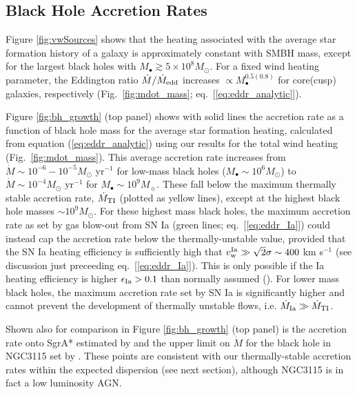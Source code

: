 \documentclass[usenatbib,fleqn]{mn2e}
\begin{document}
\subsection{Black Hole Accretion Rates}
\label{sec:mdot}

Figure \ref{fig:vwSources} shows that the heating associated with the average star formation history of a galaxy is approximately constant with SMBH mass, except for the largest black holes with $M_{\bullet} \gtrsim 5\times 10^{8}M_{\odot}$.  For a fixed wind heating parameter, the Eddington ratio $\dot{M}/\dot{M}_{\rm edd}$ increases $\propto M_{\bullet}^{0.5(0.8)}$ for core(cusp) galaxies, respectively (Fig.~\ref{fig:mdot_mass}; eq.~[\ref{eq:eddr_analytic}]).  

Figure \ref{fig:bh_growth} (top panel) shows with solid lines the accretion rate as a function of black hole mass for the average star formation heating, calculated from equation (\ref{eq:eddr_analytic}) using our results for the total wind heating (Fig.~\ref{fig:mdot_mass}).  This average accretion rate increases from $\dot{M} \sim 10^{-6}-10^{-5}M_{\odot}$ yr$^{-1}$ for low-mass black holes ($M_{\bullet} \sim 10^{6}M_{\odot}$) to $\dot{M} \sim 10^{-4}M_{\odot}$ yr$^{-1}$ for $M_{\bullet} \sim 10^{9}M_{\sun}$.  These fall below the maximum thermally stable accretion rate, $\dot{M}_{\rm TI}$ (plotted as yellow lines), except at the highest black hole masses $\sim 10^{9}M_{\odot}$.  For these highest mass black holes, the maximum accretion rate as set by gas blow-out from SN Ia (green lines; eq.~[\ref{eq:eddr_Ia}]) could instead cap the accretion rate below the thermally-unstable value, provided that the SN Ia heating efficiency is sufficiently high that $v_{\rm w}^{\rm Ia} \gg \sqrt{2}\sigma \sim 400$ km s$^{-1}$ (see discussion just preceeding eq.~[\ref{eq:eddr_Ia}]).  This is only possible if the Ia heating efficiency is higher $\epsilon_{\rm Ia} > 0.1$ than normally assumed (\citealt{Sharma+14}).  For lower mass black holes, the maximum accretion rate set by SN Ia is significantly higher and cannot prevent the development of thermally unstable flows, i.e. $\dot{M}_{\rm Ia} \gg \dot{M}_{\rm TI}$.  

Shown also for comparison in Figure \ref{fig:bh_growth} (top panel) is the accretion rate onto SgrA* estimated by \citet{Quataert:2004a} and the upper limit on $\dot{M}$ for the black hole in NGC3115 set by \citealt{ShcherbakovWong+:2014a}.  These points are consistent with our thermally-stable accretion rates within the expected dispersion (see next section), although NGC3115 is in fact a low luminosity AGN.  
\end{document}
